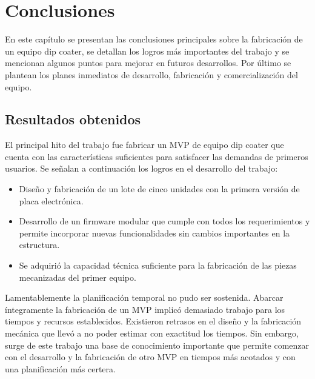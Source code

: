 
\chapter{Conclusiones} %

\label{Chapter5} %



En este capítulo se presentan las conclusiones principales sobre la fabricación de un equipo dip coater, se detallan los logros más importantes del trabajo y se mencionan algunos puntos para mejorar en futuros desarrollos. Por último se plantean los planes inmediatos de desarrollo, fabricación y comercialización del equipo.

\section{Resultados obtenidos }


El principal hito del trabajo fue fabricar un MVP de equipo dip coater que cuenta con las características suficientes para satisfacer las demandas de primeros usuarios. 
Se señalan a continuación los logros en el desarrollo del trabajo: 
\begin{itemize}
\item Diseño y fabricación de un lote de cinco unidades con la primera versión de placa electrónica.
\item Desarrollo de un firmware modular que cumple con todos los requerimientos y permite incorporar nuevas funcionalidades sin cambios importantes en la estructura.
\item Se adquirió la capacidad técnica suficiente para la fabricación de las piezas mecanizadas del primer equipo.  
\end{itemize} 
 

Lamentablemente la planificación temporal no pudo ser sostenida. Abarcar íntegramente la fabricación de un MVP implicó demasiado trabajo para los tiempos y recursos establecidos. Existieron retrasos en el diseño y la fabricación mecánica que llevó a no poder estimar con exactitud los tiempos. Sin embargo, surge de este trabajo una base de conocimiento importante que permite comenzar con el desarrollo y la fabricación de otro MVP en tiempos más acotados y con una planificación más certera. 


